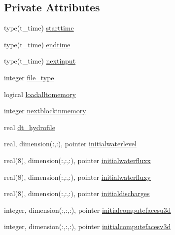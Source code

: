 \subsection*{Private Attributes}
\begin{DoxyCompactItemize}
\item 
type(t\+\_\+time) \mbox{\hyperlink{structmodulehydrodynamicfile_1_1t__input_a9bd84b51eed774d6e38a0b6cf22882b0}{starttime}}
\item 
type(t\+\_\+time) \mbox{\hyperlink{structmodulehydrodynamicfile_1_1t__input_ad0faf88f3a0e665440ab14d73a8d46ac}{endtime}}
\item 
type(t\+\_\+time) \mbox{\hyperlink{structmodulehydrodynamicfile_1_1t__input_aa2fbfd42b79c8cb7ba4e189cca359e7d}{nextinput}}
\item 
integer \mbox{\hyperlink{structmodulehydrodynamicfile_1_1t__input_aec6a1c5e9dbf5cd0f310debe91869f67}{file\+\_\+type}}
\item 
logical \mbox{\hyperlink{structmodulehydrodynamicfile_1_1t__input_a2297b097710c3471ad42225a99f0885a}{loadalltomemory}}
\item 
integer \mbox{\hyperlink{structmodulehydrodynamicfile_1_1t__input_a37a225c38c0fd16b234ceeb07fb19126}{nextblockinmemory}}
\item 
real \mbox{\hyperlink{structmodulehydrodynamicfile_1_1t__input_ad265dff3cb9105728c1cf5e92927e1c3}{dt\+\_\+hydrofile}}
\item 
real, dimension(\+:,\+:), pointer \mbox{\hyperlink{structmodulehydrodynamicfile_1_1t__input_adc58e769cf99cd01471c322ed245b62d}{initialwaterlevel}}
\item 
real(8), dimension(\+:,\+:,\+:), pointer \mbox{\hyperlink{structmodulehydrodynamicfile_1_1t__input_a03adc1960663382ba4e991cc2a203497}{initialwaterfluxx}}
\item 
real(8), dimension(\+:,\+:,\+:), pointer \mbox{\hyperlink{structmodulehydrodynamicfile_1_1t__input_a767f2fec8ce3fd9aa8f189cb8b2787a1}{initialwaterfluxy}}
\item 
real(8), dimension(\+:,\+:,\+:), pointer \mbox{\hyperlink{structmodulehydrodynamicfile_1_1t__input_a542571105725d2fa170c175113a12c6a}{initialdischarges}}
\item 
integer, dimension(\+:,\+:,\+:), pointer \mbox{\hyperlink{structmodulehydrodynamicfile_1_1t__input_a526e788fd29f034d9d95df8a673e86a4}{initialcomputefacesu3d}}
\item 
integer, dimension(\+:,\+:,\+:), pointer \mbox{\hyperlink{structmodulehydrodynamicfile_1_1t__input_ae2954d3ad457a1a2da0f5b21ba561ef4}{initialcomputefacesv3d}}

\end{DoxyCompactItemize}
